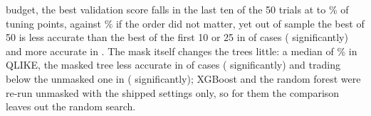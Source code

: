 budget, the best validation score falls in the last ten of the 50 trials at %
\cmBudLastMin{} to \cmBudLastMax\% of tuning points, against \cmBudLastExch\% if
the order did not matter, yet out of sample the best of 50 is less accurate %
than the best of the first 10 or 25 in \cmBudQAbove{} of \cmBudN{} cases
(\cmBudQAboveSig{} significantly) and more accurate in \cmBudQBelow. The
mask itself changes the trees little: a median of \cmMaskQMed\% in QLIKE, the %
masked tree less accurate in \cmMaskQAbove{} of \cmMaskN{} cases (\cmMaskQAboveSig{}
significantly) and trading below the unmasked one in \cmMaskShBelow{}
(\cmMaskShBelowSig{} significantly); XGBoost and the random forest were re-run unmasked
with the shipped settings only, so for them the comparison leaves out the random search.
